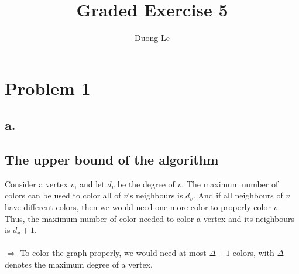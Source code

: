 \documentclass{article}
\title{Graded Exercise 5}
\author{Duong Le}
\date{}
\begin{document}
\maketitle

\section*{Problem 1}
\subsection*{a.}
\subsection*{The upper bound of the algorithm}
Consider a vertex $v$, and let $d_{v}$ be the degree of $v$. The maximum number of colors can be used to color all of $v$'s neighbours is $d_{v}$. And if all neighbours of $v$ have different colors, then we would need one more color to properly color $v$. Thus, the maximum number of color needed to color a vertex and its neighbours is $d_{v} + 1$. \\\\
$\Rightarrow$ To color the graph properly, we would need at most $\Delta + 1$ colors, with $\Delta$ denotes the maximum degree of a vertex. 
\end{document}
